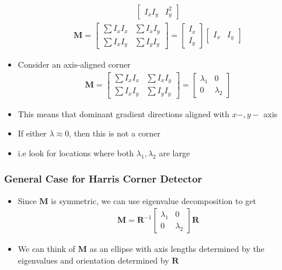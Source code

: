 \documentclass[letterpaper,12pt]{article}
\newcommand{\matr}[1]{\mathbf{#1}}
\begin{document}
\begin{itemize}
\begin{align}
\begin{bmatrix}
         I_x I_y & I^2_y
        \end{bmatrix}
       \end{align}
       \begin{align}
        \matr{M} = \begin{bmatrix}
         \sum I_x I_x & \sum I_x I_y \\
         \sum I_x I_y & \sum I_y I_y
        \end{bmatrix}
        = \begin{bmatrix}
         I_x \\
         I_y
        \end{bmatrix}
        \begin{bmatrix}
         I_x & I_y
        \end{bmatrix}
       \end{align}
 \item Consider an axis-aligned corner
       \begin{align}
        \matr{M} = \begin{bmatrix}
         \sum I_x I_x & \sum I_x I_y \\
         \sum I_x I_y & \sum I_y I_y
        \end{bmatrix}
        = \begin{bmatrix}
         \lambda_1 & 0         \\
         0         & \lambda_2
        \end{bmatrix}
       \end{align}
 \item This means that dominant gradient directions aligned with $x-,y-$ axis
 \item If either $\lambda \approx 0$, then this is not a corner
 \item i.e look for locations where both $\lambda_1, \lambda_2$ are large
\end{itemize}

\subsubsection{General Case for Harris Corner Detector }
\begin{itemize}
 \item Since $\matr{M}$ is symmetric, we can use eigenvalue decomposition to get
       \begin{align}
        \matr{M} = \matr{R}^{-1} \begin{bmatrix}
         \lambda_1 & 0         \\
         0         & \lambda_2
        \end{bmatrix}
        \matr{R}
       \end{align}
 \item We can think of $\matr{M}$ as an ellipse with axis lengths determined by the eigenvalues and orientation determined by $\matr{R}$
\end{itemize}
\end{document}
